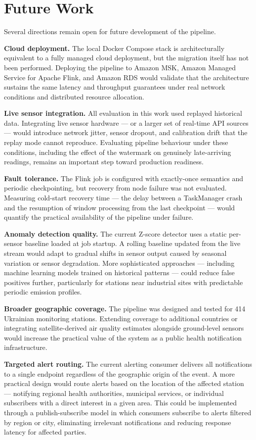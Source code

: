 \chapter{Future Work}

Several directions remain open for future development of the pipeline.

\textbf{Cloud deployment.} The local Docker Compose stack is architecturally equivalent to a fully managed cloud deployment, but the migration itself has not been performed. Deploying the pipeline to Amazon MSK, Amazon Managed Service for Apache Flink, and Amazon RDS would validate that the architecture sustains the same latency and throughput guarantees under real network conditions and distributed resource allocation.

\textbf{Live sensor integration.} All evaluation in this work used replayed historical data. Integrating live sensor hardware — or a larger set of real-time API sources — would introduce network jitter, sensor dropout, and calibration drift that the replay mode cannot reproduce. Evaluating pipeline behaviour under these conditions, including the effect of the watermark on genuinely late-arriving readings, remains an important step toward production readiness.

\textbf{Fault tolerance.} The Flink job is configured with exactly-once semantics and periodic checkpointing, but recovery from node failure was not evaluated. Measuring cold-start recovery time — the delay between a TaskManager crash and the resumption of window processing from the last checkpoint — would quantify the practical availability of the pipeline under failure.

\textbf{Anomaly detection quality.} The current Z-score detector uses a static per-sensor baseline loaded at job startup. A rolling baseline updated from the live stream would adapt to gradual shifts in sensor output caused by seasonal variation or sensor degradation. More sophisticated approaches — including machine learning models trained on historical patterns — could reduce false positives further, particularly for stations near industrial sites with predictable periodic emission profiles.

\textbf{Broader geographic coverage.} The pipeline was designed and tested for 414 Ukrainian monitoring stations. Extending coverage to additional countries or integrating satellite-derived air quality estimates alongside ground-level sensors would increase the practical value of the system as a public health notification infrastructure.

\textbf{Targeted alert routing.} The current alerting consumer delivers all notifications to a single endpoint regardless of the geographic origin of the event. A more practical design would route alerts based on the location of the affected station — notifying regional health authorities, municipal services, or individual subscribers with a direct interest in a given area. This could be implemented through a publish-subscribe model in which consumers subscribe to alerts filtered by region or city, eliminating irrelevant notifications and reducing response latency for affected parties.